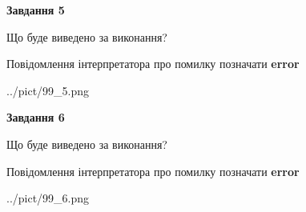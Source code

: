 \documentclass[12pt, ukrainian]{article}
\begin{document}
{{\begin {center}\textbf{Завдання 5}\end {center}}\par
Що буде виведено за виконання? \par
Повідомлення інтерпретатора про помилку позначати \textbf{error}

\begin{center}
	{../pict/99_5.png}
\end{center}
\newpage

{\begin {center}\textbf{Завдання 6}\end {center}}\par
Що буде виведено за виконання? \par
Повідомлення інтерпретатора про помилку позначати \textbf{error}

\begin{center}
	{../pict/99_6.png}
\end{center}
\newpage

}
\end{document}
